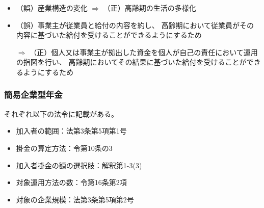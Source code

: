 \begin{sol}
  \;

  \begin{itemize}
    \item （誤）産業構造の変化 $\Longrightarrow$ （正）高齢期の生活の多様化
    \item （誤）事業主が従業員と給付の内容を約し、
      高齢期において従業員がその内容に基づいた給付を受けることができるようにするため 
      
      $\Longrightarrow$ 
      （正）個人又は事業主が拠出した資金を個人が自己の責任において運用の指図を行い、
      高齢期においてその結果に基づいた給付を受けることができるようにするため
  \end{itemize}
\end{sol}

\newpage

\subsubsection{簡易企業型年金}

\begin{itembox}[l]{}
  それぞれ以下の法令に記載がある。
  \begin{itemize}
    \item 加入者の範囲：法第3条第5項第1号
    \item 掛金の算定方法：令第10条の3
    \item 加入者掛金の額の選択肢：解釈第1-3(3)
    \item 対象運用方法の数：令第16条第2項
    \item 対象の企業規模：法第3条第5項第2号
  \end{itemize}
\end{itembox}


